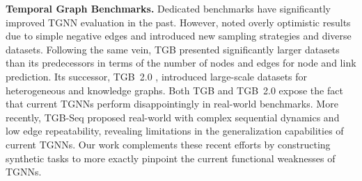 \textbf{Temporal Graph Benchmarks.} Dedicated benchmarks \citep{Jodie_Kumar_2019, uci, enron, social-evo} have significantly improved TGNN evaluation in the past. However, \cite{poursafaei2022betterevaluationdynamiclink} noted overly optimistic results due to simple negative edges and introduced new sampling strategies and diverse datasets. Following the same vein,  TGB \citep{tgb} presented significantly larger datasets than its predecessors in terms of the number of nodes and edges for node and link prediction. Its successor, TGB~2.0 \citep{tgb2.0}, introduced large-scale datasets for heterogeneous and knowledge graphs. Both TGB and TGB~2.0 expose the fact that current TGNNs perform disappointingly in real-world benchmarks. More recently, TGB-Seq \citep{tgb-seq} proposed real-world with complex sequential dynamics and low edge repeatability, revealing limitations in the generalization capabilities of current TGNNs. Our work complements these recent efforts by constructing synthetic tasks to more exactly pinpoint the current functional weaknesses of TGNNs.





